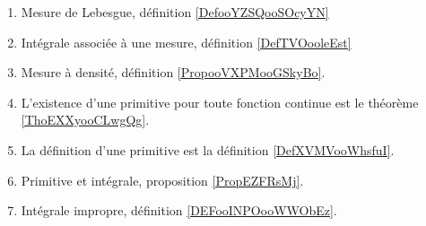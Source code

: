 
\begin{enumerate}
        \item
            Mesure de Lebesgue, définition \ref{DefooYZSQooSOcyYN}
        \item
            Intégrale associée à une mesure, définition \ref{DefTVOooleEst}
        \item
            Mesure à densité, définition \ref{PropooVXPMooGSkyBo}.
    \item
        L'existence d'une primitive pour toute fonction continue est le théorème \ref{ThoEXXyooCLwgQg}.
    \item
        La définition d'une primitive est la définition \ref{DefXVMVooWhsfuI}.
    \item
        Primitive et intégrale, proposition \ref{PropEZFRsMj}.
    \item
        Intégrale impropre, définition \ref{DEFooINPOooWWObEz}.
\end{enumerate}

